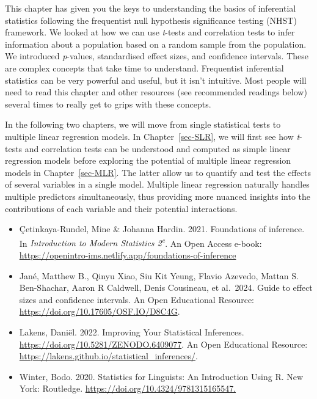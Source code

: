 \documentclass[
  letterpaper,
  DIV=11,
  numbers=noendperiod]{scrreprt}
\begin{document}
This chapter has given you the keys to understanding the basics of
inferential statistics following the frequentist null hypothesis
significance testing (NHST) framework. We looked at how we can use
\emph{t}-tests and correlation tests to infer information about a
population based on a random sample from the population. We introduced
\emph{p}-values, standardised effect sizes, and confidence intervals.
These are complex concepts that take time to understand. Frequentist
inferential statistics can be very powerful and useful, but it isn't
intuitive. Most people will need to read this chapter and other
resources (see recommended readings below) several times to really get
to grips with these concepts.

In the following two chapters, we will move from single statistical
tests to multiple linear regression models. In Chapter~\ref{sec-SLR}, we
will first see how \emph{t}-tests and correlation tests can be
understood and computed as simple linear regression models before
exploring the potential of multiple linear regression models in
Chapter~\ref{sec-MLR}. The latter allow us to quantify and test the
effects of several variables in a single model. Multiple linear
regression naturally handles multiple predictors simultaneously, thus
providing more nuanced insights into the contributions of each variable
and their potential interactions.

\begin{tcolorbox}[enhanced jigsaw, arc=.35mm, bottomrule=.15mm, bottomtitle=1mm, breakable, colback=white, colbacktitle=quarto-callout-tip-color!10!white, colframe=quarto-callout-tip-color-frame, coltitle=black, left=2mm, leftrule=.75mm, opacityback=0, opacitybacktitle=0.6, rightrule=.15mm, title=\textcolor{quarto-callout-tip-color}{\faLightbulb}\hspace{0.5em}{Recommended readings~\emoji{books}}, titlerule=0mm, toprule=.15mm, toptitle=1mm]

\begin{itemize}
\item
  Çetinkaya-Rundel, Mine \& Johanna Hardin. 2021. Foundations of
  inference. In \emph{Introduction to Modern Statistics
  2\textsuperscript{e}}. An Open Access e-book:
  \url{https://openintro-ims.netlify.app/foundations-of-inference}
\item
  Jané, Matthew B., Qinyu Xiao, Siu Kit Yeung, Flavio Azevedo, Mattan S.
  Ben-Shachar, Aaron R Caldwell, Denis Cousineau, et al.~2024. Guide to
  effect sizes and confidence intervals. An Open Educational Resource:
  \url{https://doi.org/10.17605/OSF.IO/D8C4G}.
\item
  Lakens, Daniël. 2022. Improving Your Statistical Inferences.
  \url{https://doi.org/10.5281/ZENODO.6409077}. An Open Educational
  Resource: \url{https://lakens.github.io/statistical_inferences/}.
\item
  Winter, Bodo. 2020. Statistics for Linguists: An Introduction Using R.
  New York: Routledge. \url{https://doi.org/10.4324/9781315165547.}
\end{itemize}

\end{tcolorbox}
\end{document}
